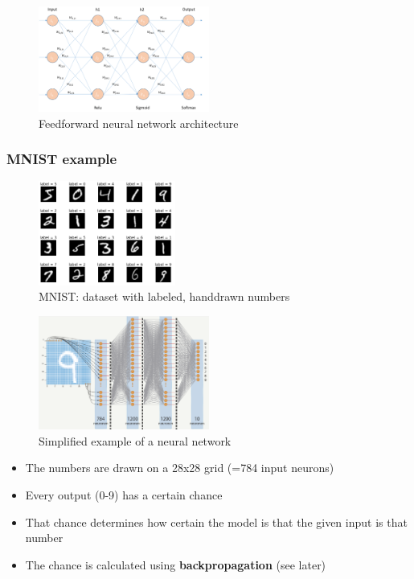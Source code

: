 \documentclass{article}
\begin{document}
\begin{figure}[H]
    \centering
    \includegraphics[width=0.5\textwidth]{feedforward-neural-network-properties.png}
    \caption{Feedforward neural network architecture}
\end{figure}

\subsubsection{MNIST example}

\begin{figure}[H]
    \centering
    \includegraphics[width=0.4\textwidth]{mnist-neural.png}
    \caption{MNIST: dataset with labeled, handdrawn numbers}
\end{figure}

\begin{figure}[H]
    \centering
    \includegraphics[width=0.5\textwidth]{mnist-neural2.png}
    \caption{Simplified example of a neural network}
\end{figure}

\begin{itemize}
    \item The numbers are drawn on a 28x28 grid (=784 input neurons)
    \item Every output (0-9) has a certain chance
    \item That chance determines how certain the model is that the given input is that number
    \item The chance is calculated using \textbf{backpropagation} (see later)
\end{itemize}
\end{document}
